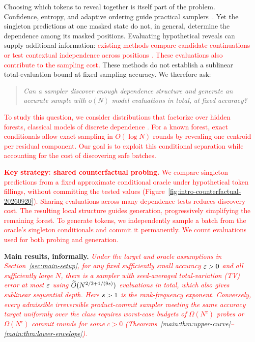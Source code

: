 \documentclass{article} %
\begin{document}
Choosing which tokens to reveal together is itself part of the problem.
Confidence, entropy, and adaptive ordering guide practical
samplers~\textcolor{red}{\citep{chang2022maskgit,benhamu2025accelerated,kim2025train,hayakawa2026demystifying}}.
Yet the singleton predictions at one masked state do not, in general,
determine the dependence among its masked positions.
Evaluating hypothetical reveals can supply additional information:
\textcolor{red}{existing methods compare candidate continuations or test contextual
independence across positions
\citep{lee2025lookahead,azangulov2025parallel}.}
\textcolor{red}{These evaluations also contribute to the sampling cost.}
These methods do not establish a sublinear total-evaluation bound at fixed
sampling accuracy. We therefore ask:
\begin{quote}
\emph{Can a sampler discover enough dependence structure and generate an
accurate sample with $o(N)$ model evaluations in total, at fixed accuracy?}
\end{quote}

\textcolor{red}{To study this question, we consider distributions that factorize
over hidden forests, classical models of discrete dependence
\citep{chowliu1968dependence,tan2011markovforest}.
For a known forest, exact conditionals allow exact sampling in
$O(\log N)$ rounds by revealing one centroid per residual component.
Our goal is to exploit this conditional separation while accounting for
the cost of discovering safe batches.}

\textbf{\textcolor{red}{Key strategy: shared counterfactual probing.}}
\textcolor{red}{We compare singleton predictions from a fixed approximate
conditional oracle under hypothetical token fillings, without committing
the tested values
(Figure~\ref{fig:intro-counterfactual-20260920}).
Sharing evaluations across many dependence tests reduces discovery cost.
The resulting local structure guides generation, progressively simplifying
the remaining forest. To generate tokens, we independently sample a batch
from the oracle's singleton conditionals and commit it permanently.
We count evaluations used for both probing and generation.}



\textbf{Main results, informally.}
\textcolor{red}{\emph{Under the target and oracle assumptions in
Section~\ref{sec:main-setup}, for any fixed sufficiently small accuracy
$\varepsilon>0$ and all sufficiently large $N$, there is a sampler
with seed-averaged total-variation (TV) error at most $\varepsilon$
using $\widetilde O(N^{2/3+1/(9s)})$ evaluations in total,
which also gives sublinear sequential depth.
Here $s>1$ is the rank-frequency exponent.
Conversely, every admissible irreversible product-commit sampler meeting
the same accuracy target uniformly over the class requires worst-case
budgets of $\Omega(N^c)$ probes or $\Omega(N^c)$ commit rounds for some
$c>0$ (Theorems~\ref{main:thm:upper-curve}--\ref{main:thm:lower-envelope}).}}
\end{document}
